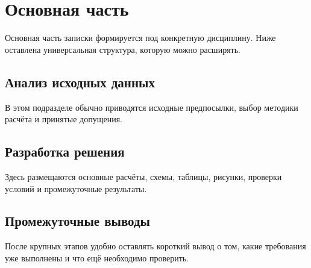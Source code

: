 \section{Основная часть}

Основная часть записки формируется под конкретную дисциплину.
Ниже оставлена универсальная структура, которую можно расширять.

\subsection{Анализ исходных данных}

В этом подразделе обычно приводятся исходные предпосылки,
выбор методики расчёта и принятые допущения.

\subsection{Разработка решения}

Здесь размещаются основные расчёты, схемы, таблицы, рисунки,
проверки условий и промежуточные результаты.

\subsection{Промежуточные выводы}

После крупных этапов удобно оставлять короткий вывод о том,
какие требования уже выполнены и что ещё необходимо проверить.
